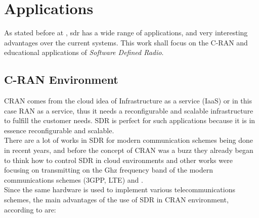\section{Applications}
\label{sec:sdr_app}

As stated before  at \cite{sdr:overview}, sdr has a wide range of applications,
and very interesting advantages over the current systems. This work shall focus
on the C-RAN and educational applications of \emph{Software Defined Radio}.

\subsection{C-RAN Environment}

CRAN comes from the cloud idea of Infrastructure as a service (IaaS) or in this
case RAN as a service, thus it needs a reconfigurable and scalable infrastructure
to fulfill the customer needs. SDR is perfect for such applications because  it
is in essence reconfigurable and scalable.\\

There are a lot of works in SDR for modern communication schemes being done in recent years,
and before the concept of CRAN was a buzz they already began to think how to control
SDR in cloud environments \cite{dayananda2012} and other works were focusing on transmitting on the
Ghz frequency band of the modern communications schemes (3GPP, LTE) \cite{kelley2009} and \cite{neenu2014}.\\

Since the same hardware is used to implement various telecommunications schemes,
the main advantages of the use of SDR in CRAN environment, according to \cite{dayananda2012} are:

